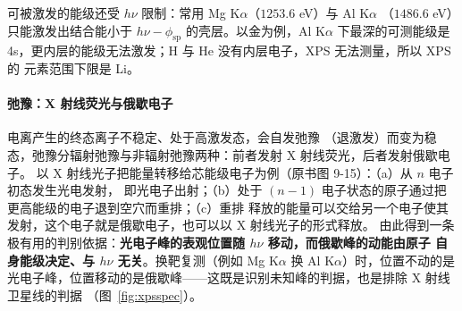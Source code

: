 可被激发的能级还受 $h\nu$ 限制：常用 Mg K$\alpha$（$1253.6$ eV）与 Al K$\alpha$
（$1486.6$ eV）只能激发出结合能小于 $h\nu-\phi_{\mathrm{sp}}$ 的壳层。以金为例，Al K$\alpha$
下最深的可测能级是 4s，更内层的能级无法激发；H 与 He 没有内层电子，XPS 无法测量，所以 XPS 的
元素范围下限是 Li。

\paragraph{弛豫：X 射线荧光与俄歇电子}电离产生的终态离子不稳定、处于高激发态，会自发弛豫
（退激发）而变为稳态，弛豫分辐射弛豫与非辐射弛豫两种：前者发射 X 射线荧光，后者发射俄歇电子。
以 X 射线光子把能量转移给芯能级电子为例（原书图 9-15）：（a）从 $n$ 电子初态发生光电发射，
即光电子出射；（b）处于 $(n-1)$ 电子状态的原子通过把更高能级的电子退到空穴而重排；（c）重排
释放的能量可以交给另一个电子使其发射，这个电子就是俄歇电子，也可以以 X 射线光子的形式释放。
由此得到一条极有用的判别依据：\textbf{光电子峰的表观位置随 $h\nu$ 移动，而俄歇峰的动能由原子
自身能级决定、与 $h\nu$ 无关}。换靶复测（例如 Mg K$\alpha$ 换 Al K$\alpha$）时，位置不动的是
光电子峰，位置移动的是俄歇峰——这既是识别未知峰的判据，也是排除 X 射线卫星线的判据
（图~\ref{fig:xpsspec}）。

